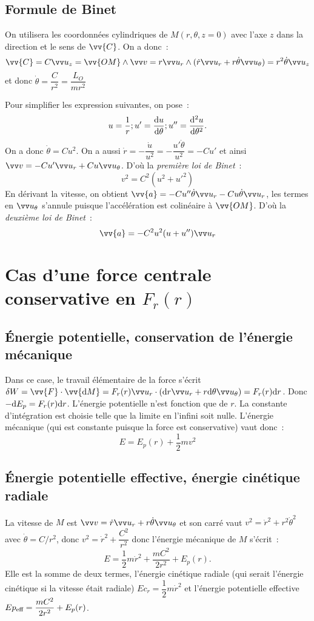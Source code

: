 \subsection{Formule de Binet}%
On utilisera les coordonnées cylindriques de \(M(r, \theta, z=0)\) avec l'axe 
\(z\) dans la direction et le sens de \(\vv{C}\). On a donc~:
\[\vv{C} = C \uz = \vv{OM} \wedge \vvv = r \ur \wedge (\dot{r}\ur + 
r\dot{\theta} \utheta) = r^2\dot{\theta} \uz\]
et donc \(\dot{\theta} = \dfrac{C}{r^2} = \dfrac{L_O}{mr^2}\)

Pour simplifier les expression suivantes, on pose~:
\[u = \dfrac{1}{r} ; u'=\dfrac{\mathrm{d} u}{\mathrm{d} \theta} ; u''=\dfrac{\mathrm{d}^2 u}{\mathrm{d} {\theta}^2}.\]
On a donc \(\dot{\theta} = Cu^2\). On a aussi \(\dot{r} = -\dfrac{\dot{u}}{u^2} 
= -\dfrac{u' \dot{\theta}}{u^2} = -Cu'\) et ainsi \(\vvv = -Cu' \ur + Cu 
\utheta\). D'où la \emph{première loi de Binet}~:
\begin{equation}%
  v^2 = C^2(u^2 + u'^2)
\end{equation}%
En dérivant la vitesse, on obtient \(\vv{a} = -Cu''\dot{\theta}\ur 
-Cu\dot{\theta}\ur\), les termes en \(\utheta\) s'annule puisque l'accélération 
est colinéaire à \(\vv{OM}\). D'où la \emph{deuxième loi de Binet}~:
\begin{equation}%
  \vv{a} = -C^2u^2(u+u'')\ur
\end{equation}%
\section{Cas d'une force centrale conservative en \(F_r(r)\)}%
\subsection{Énergie potentielle, conservation de l'énergie mécanique}%
Dans ce case, le travail élémentaire de la force s'écrit \(\delta{}W = 
\vv{F}\cdot\vv{\D{M}} = F_r(r)\ur\cdot(\D{r}\ur + r\D{\theta}\utheta) = %
F_r(r)\D{r}\). Donc \(-\mathrm{d}{E_p} = F_r(r)\mathrm{d}{r}\). L'énergie potentielle n'est 
fonction que de \(r\). La constante d'intégration est choisie telle que la 
limite en l'infini soit nulle. L'énergie mécanique (qui est constante puisque 
la force est conservative) vaut donc~:
\[E = E_p(r) + \dfrac{1}{2} mv^2\]

\subsection{Énergie potentielle effective, énergie cinétique radiale}%
La vitesse de \(M\) est \(\vvv = \dot{r}\ur + r\dot{\theta}\utheta\) et son 
carré vaut \(v^2 = \dot{r}^2 + r^2\dot{\theta}^2\) avec \(\dot{\theta} = 
C/r^2\), donc \(v^2 = \dot{r}^2 + \dfrac{C^2}{r^2}\) donc l'énergie mécanique 
de \(M\) s'écrit~:
\[E = \dfrac{1}{2}m\dot{r}^2 + \dfrac{mC^2}{2r^2} + E_p(r).\]
Elle est la somme de deux termes, l'énergie cinétique radiale (qui serait 
l'énergie cinétique si la vitesse était radiale) \(Ec_r = 
\dfrac{1}{2}m\dot{r}^2\) et l'énergie potentielle %
effective \(Ep_{\textmd{eff}} = \dfrac{mC^2}{2r^2} + E_p(r)\).

